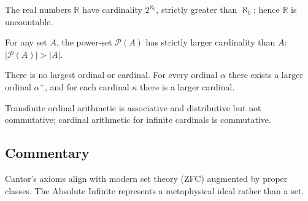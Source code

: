 \begin{theorem}
The real numbers $\mathbb{R}$ have cardinality $2^{\aleph_0}$, strictly greater than $\aleph_0$; hence $\mathbb{R}$ is uncountable.
\end{theorem}

\begin{theorem}
For any set $A$, the power-set $\mathcal{P}(A)$ has strictly larger cardinality than $A$: $|\mathcal{P}(A)|>|A|$.
\end{theorem}

\begin{theorem}
There is no largest ordinal or cardinal. For every ordinal $\alpha$ there exists a larger ordinal $\alpha^+$, and for each cardinal $\kappa$ there is a larger cardinal.
\end{theorem}

\begin{theorem}
Transfinite ordinal arithmetic is associative and distributive but not commutative; cardinal arithmetic for infinite cardinals is commutative.
\end{theorem}

\subsection*{Commentary}
Cantor's axioms align with modern set theory (ZFC) augmented by proper classes. The Absolute Infinite represents a metaphysical ideal rather than a set.
